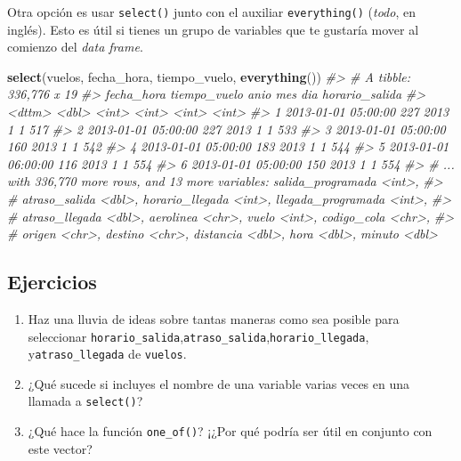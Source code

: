\documentclass[11pt,oneside]{report}
\newenvironment{Shaded}{\begin{snugshade}}{\end{snugshade}}
\newcommand{\CommentTok}[1]{\textcolor[rgb]{0.56,0.35,0.01}{\textit{#1}}}
\newcommand{\KeywordTok}[1]{\textcolor[rgb]{0.13,0.29,0.53}{\textbf{#1}}}
\newcommand{\NormalTok}[1]{#1}
\begin{document}
Otra opción es usar \texttt{select()} junto con el auxiliar
\texttt{everything()} (\emph{todo}, en inglés). Esto es útil si tienes
un grupo de variables que te gustaría mover al comienzo del \emph{data
frame}.

\begin{Shaded}
\begin{Highlighting}[]
\KeywordTok{select}\NormalTok{(vuelos, fecha_hora, tiempo_vuelo, }\KeywordTok{everything}\NormalTok{())}
\CommentTok{#> # A tibble: 336,776 x 19}
\CommentTok{#>   fecha_hora          tiempo_vuelo  anio   mes   dia horario_salida}
\CommentTok{#>   <dttm>                     <dbl> <int> <int> <int>          <int>}
\CommentTok{#> 1 2013-01-01 05:00:00          227  2013     1     1            517}
\CommentTok{#> 2 2013-01-01 05:00:00          227  2013     1     1            533}
\CommentTok{#> 3 2013-01-01 05:00:00          160  2013     1     1            542}
\CommentTok{#> 4 2013-01-01 05:00:00          183  2013     1     1            544}
\CommentTok{#> 5 2013-01-01 06:00:00          116  2013     1     1            554}
\CommentTok{#> 6 2013-01-01 05:00:00          150  2013     1     1            554}
\CommentTok{#> # ... with 336,770 more rows, and 13 more variables: salida_programada <int>,}
\CommentTok{#> #   atraso_salida <dbl>, horario_llegada <int>, llegada_programada <int>,}
\CommentTok{#> #   atraso_llegada <dbl>, aerolinea <chr>, vuelo <int>, codigo_cola <chr>,}
\CommentTok{#> #   origen <chr>, destino <chr>, distancia <dbl>, hora <dbl>, minuto <dbl>}
\end{Highlighting}
\end{Shaded}

\hypertarget{ejercicios-10}{%
\subsection{Ejercicios}\label{ejercicios-10}}

\begin{enumerate}
\def\labelenumi{\arabic{enumi}.}
\item
  Haz una lluvia de ideas sobre tantas maneras como sea posible para
  seleccionar
  \texttt{horario\_salida},\texttt{atraso\_salida},\texttt{horario\_llegada},
  y\texttt{atraso\_llegada} de \texttt{vuelos}.
\item
  ¿Qué sucede si incluyes el nombre de una variable varias veces en una
  llamada a \texttt{select()}?
\item
  ¿Qué hace la función \texttt{one\_of()}? ¡¿Por qué podría ser útil en
  conjunto con este vector?
\end{enumerate}
\end{document}
